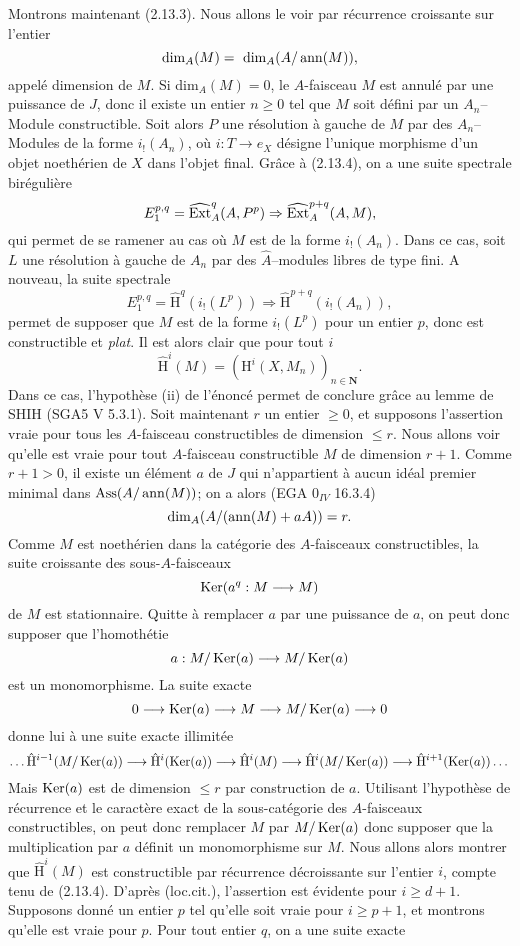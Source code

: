 Montrons maintenant (2.13.3). Nous allons le voir par récurrence croissante sur l'entier
$$
\text{dim}_A(M) =~\text{dim}_A(A/\operatorname{ann}(M)), 
$$
appelé dimension de $M$. Si dim$_A(M) = 0$, le $A$-faisceau $M$ est annulé par une puissance de $J$, donc il existe un entier $n \geq 0$ tel que $M$ soit défini par un $A_n$--Module constructible. Soit alors $P$ une résolution à gauche de $M$ par des $A_n$--Modules de la forme $i_!(A_n)$, où $i: T \to e_X$ désigne l'unique morphisme d'un objet noethérien de $X$ dans l'objet final. Grâce à (2.13.4), on a une suite spectrale birégulière
$$
E^{p, q}_1 = \widehat{\operatorname{Ext}}^q_A(A, P^p) \Rightarrow \widehat{\operatorname{Ext}}^{p+q}_A(A, M),
$$
qui permet de se ramener au cas où $M$ est de la forme $i_!(A_n)$. Dans ce cas, soit $L$ une résolution à gauche de $A_n$ par des $\hat{A}$--modules libres de type fini. A nouveau, la suite spectrale
$$
E^{p, q}_1 = \hat{\mathrm{H}}^q(i_!(L^p)) \Rightarrow \hat{\mathrm{H}}^{p+q}(i_!(A_n)),
$$
permet de supposer que $M$ est de la forme $i_!(L^p)$ pour un entier $p$, donc est constructible et \emph{plat}. Il est alors clair que pour tout $i$
$$
\hat{\mathrm{H}}^i(M) = (\mathrm{H}^i(X, M_n))_{n \in \mathbf{N}}.
$$
Dans ce cas, l'hypothèse (ii) de l'énoncé permet de conclure grâce au lemme de SHIH (SGA5 V 5.3.1). Soit maintenant $r$ un entier $\geq 0$, et supposons l'assertion vraie pour tous les $A$-faisceau constructibles de dimension $\leq r$. Nous allons voir qu'elle est vraie pour tout $A$-faisceau constructible $M$ de dimension $r+1$. Comme $r+1 > 0$, il existe un élément $a$ de $J$ qui n'appartient à aucun idéal premier minimal dans $\operatorname{Ass}(A/\operatorname{ann}(M))$; on a alors (EGA $0_{IV}$ 16.3.4)
$$
\text{dim}_A(A/(\operatorname{ann}(M) + aA)) = r.
$$
Comme $M$ est noethérien dans la catégorie des $A$-faisceaux constructibles, la suite croissante des sous-$A$-faisceaux
$$
\operatorname{Ker}(a^q: M \longrightarrow M)
$$
de $M$ est stationnaire. Quitte à remplacer $a$ par une puissance de $a$, on peut donc supposer que l'homothétie
$$
a: M/\operatorname{Ker}(a) \longrightarrow M/\operatorname{Ker}(a)
$$
est un monomorphisme. La suite exacte
$$
0 \longrightarrow \operatorname{Ker}(a) \longrightarrow M \longrightarrow M/\operatorname{Ker}(a) \longrightarrow 0
$$
donne lui à une suite exacte illimitée
$$
\dots \hat{\mathrm{H}}^{i-1}(M/\operatorname{Ker}(a)) \longrightarrow \hat{\mathrm{H}}^i(\operatorname{Ker}(a)) \longrightarrow \hat{\mathrm{H}}^i(M) \longrightarrow \hat{\mathrm{H}}^i(M/\operatorname{Ker}(a)) \longrightarrow \hat{\mathrm{H}}^{i+1}(\operatorname{Ker}(a)) \dots 
$$
Mais $\operatorname{Ker}(a)$ est de dimension $\leq r$ par construction de $a$. Utilisant l'hypothèse de récurrence et le caractère exact de la sous-catégorie des $A$-faisceaux constructibles, on peut donc remplacer $M$ par $M/\operatorname{Ker}(a)$ donc supposer que la multiplication par $a$ définit un monomorphisme sur $M$. Nous allons alors montrer que $\hat{\mathrm{H}}^i(M)$ est constructible par récurrence décroissante sur l'entier $i$, compte tenu de (2.13.4). D'après (loc.cit.), l'assertion est évidente pour $i \geq d+1$. Supposons donné un entier $p$ tel qu'elle soit vraie pour $i \geq p+1$, et montrons qu'elle est vraie pour $p$. Pour tout entier $q$, on a une suite exacte
